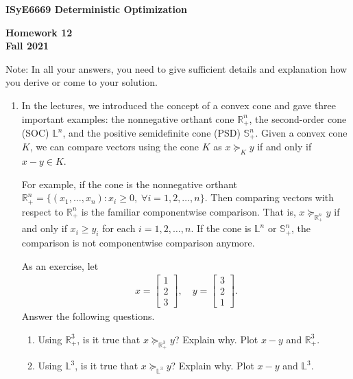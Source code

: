 \documentclass[11pt]{article}
\begin{document}
\begin{center}
{\bf ISyE6669 Deterministic Optimization}

{\bf Homework 12\\ Fall 2021}
\end{center}

Note: In all your answers, you need to give sufficient details and explanation how you derive or come to your solution.

\begin{enumerate}

\item In the lectures, we introduced the concept of a convex cone and gave three important examples: the nonnegative orthant cone $\mathbb{R}^n_+$, the second-order cone (SOC) $\mathbb{L}^n$, and the positive semidefinite cone (PSD) $\mathbb{S}^n_+$. Given a convex cone $K$, we can compare vectors using the cone $K$ as $x\succeq_K y$ if and only if $x-y\in K$.

For example, if the cone is the nonnegative orthant $\mathbb{R}^n_+ = \{(x_1,\dots,x_n) : x_i\ge 0, \;\forall i=1,2,\dots,n\}$. Then comparing vectors with respect to $\mathbb{R}^n_+$ is the familiar componentwise comparison. That is, $x\succeq_{\mathbb{R}^n_+} y$ if and only if $x_i\ge y_i$ for each $i=1,2,\dots,n$. If the cone is $\mathbb{L}^n$ or $\mathbb{S}^n_+$, the comparison is not componentwise comparison anymore. 

As an exercise, let
\begin{align*}
    x = \begin{bmatrix}
            1 \\ 2 \\ 3
        \end{bmatrix}, \quad 
    y = \begin{bmatrix}
            3\\ 2 \\ 1
        \end{bmatrix}.
\end{align*}
Answer the following questions.
\begin{enumerate}
    \item Using $\mathbb{R}^3_+$, is it true that 
    $x \succeq_{\mathbb{R}^3_+} y$?
    Explain why. Plot $x-y$ and $\mathbb{R}^3_+$.
    
    \item Using $\mathbb{L}^3$, is it true that $x\succeq_{\mathbb{L}^3} y$? Explain why. Plot $x-y$ and $\mathbb{L}^3$. 
    

\end{enumerate}
\end{enumerate}
\end{document}
